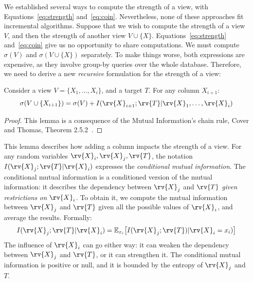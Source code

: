 We established several ways to compute the strength of a view, with
Equations~\ref{eq:strength} and~\ref{eq:coin}. Nevertheless, none of these
approaches fit incremental algorithms.  Suppose that we wish to compute the
strength of a view $V$, and then the strength of another view $V \cup \{X\}$.
Equations~\ref{eq:strength} and~\ref{eq:coin} give us no opportunity to share
computations.  We must compute $\sigma(V)$ and $\sigma(V \cup \{X\})$
separately. To make things worse, both expressions are expensive, as they
involve group-by queries over the whole database. Therefore, we need to derive
a new \emph{recursive} formulation for the strength of a view:
\begin{lemma}\label{lem:chain}
Consider a view $V = \{X_1, \ldots, X_i\}$, and a target $T$.
For any column $X_{i+1}$: 
\begin{equation}\label{eq:bonus}
    \sigma(V \cup \{X_{i+1}\}) =  \sigma(V) + I(\rv{X}_{i+1} ; \rv{T} | \rv{X}_1 , \ldots, \rv{X}_i)
\end{equation}
\end{lemma}
\begin{proof}
This lemma is a consequence of the Mutual Information's chain rule,
Cover and Thomas, Theorem 2.5.2~\cite{cover2012elements}.
\end{proof}
This lemma describes how adding a column impacts the strength of a view.  For
any random variables $\rv{X}_i, \rv{X}_j, \rv{T}$, the notation
$I(\rv{X}_j;\rv{T}|\rv{X}_i)$  expresses the \emph{conditional mutual
information}. The conditional mutual information is a conditioned version of
the mutual information: it describes the dependency between $\rv{X}_j$ and
$\rv{T}$ \emph{given restrictions on $\rv{X}_i$}. To obtain it, we compute the
mutual information between $\rv{X}_j$ and $\rv{T}$ given all the possible
values of $\rv{X}_i$, and average the results. Formally:
\begin{equation}\label{eq:condmutinfo}
    I(\rv{X}_j;\rv{T}|\rv{X}_i) = \mathbb{E}_{x_i}\big[ I(\rv{X}_j; \rv{T})| \rv{X}_i = x_i)  \big]
\end{equation}
The influence of $\rv{X}_i$ can go either way: it can weaken the dependency between
$\rv{X}_j$ and $\rv{T}$, or it can strengthen it. The conditional mutual information is
positive or null, and it is bounded by the entropy of $\rv{X}_j$ and $T$. 

